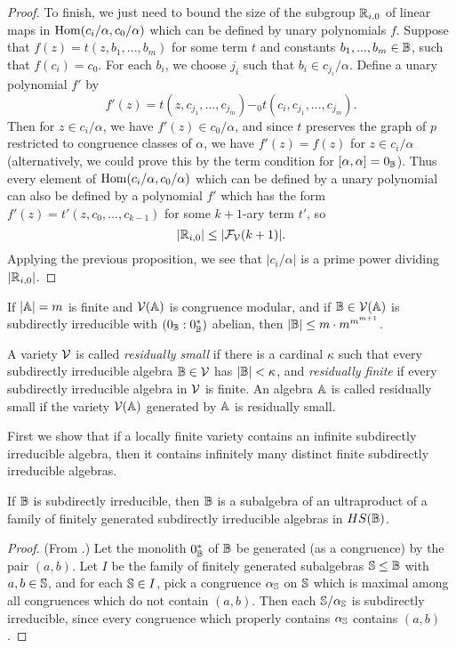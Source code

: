 \begin{appendices}
\begin{proof}
To finish, we just need to bound the size of the subgroup $\mathbb{R}_{i,0}$ of linear maps in $\operatorname{Hom}(c_i/\alpha, c_0/\alpha)$ which can be defined by unary polynomials $f$. Suppose that $f(z) = t(z,b_1, ..., b_m)$ for some term $t$ and constants $b_1, ..., b_m \in \mathbb{B}$, such that $f(c_i) = c_0$. For each $b_i$, we choose $j_i$ such that $b_i \in c_{j_i}/\alpha$. Define a unary polynomial $f'$ by
\[
f'(z) = t(z,c_{j_1}, ..., c_{j_m}) -_0 t(c_i, c_{j_1}, ..., c_{j_m}).
\]
Then for $z \in c_i/\alpha$, we have $f'(z) \in c_0/\alpha$, and since $t$ preserves the graph of $p$ restricted to congruence classes of $\alpha$, we have $f'(z) = f(z)$ for $z \in c_i/\alpha$ (alternatively, we could prove this by the term condition for $[\alpha,\alpha] = 0_{\mathbb{B}}$). Thus every element of $\operatorname{Hom}(c_i/\alpha,c_0/\alpha)$ which can be defined by a unary polynomial can also be defined by a polynomial $f'$ which has the form $f'(z) = t'(z,c_0,...,c_{k-1})$ for some $k+1$-ary term $t'$, so
\[
|\mathbb{R}_{i,0}| \le |\mathcal{F}_{\mathcal{V}}(k+1)|.
\]
Applying the previous proposition, we see that $|c_i/\alpha|$ is a prime power dividing $|\mathbb{R}_{i,0}|$.
\end{proof}

\begin{cor}\label{subdirect-bound-ab} If $|\mathbb{A}| = m$ is finite and $\mathcal{V}(\mathbb{A})$ is congruence modular, and if $\mathbb{B} \in \mathcal{V}(\mathbb{A})$ is subdirectly irreducible with $(0_{\mathbb{B}}:0_{\mathbb{B}}^*)$ abelian, then $|\mathbb{B}| \le m\cdot m^{m^{m+1}}$.
\end{cor}

\begin{defn} A variety $\mathcal{V}$ is called \emph{residually small} if there is a cardinal $\kappa$ such that every subdirectly irreducible algebra $\mathbb{B} \in \mathcal{V}$ has $|\mathbb{B}| < \kappa$, and \emph{residually finite} if every subdirectly irreducible algebra in $\mathcal{V}$ is finite. An algebra $\mathbb{A}$ is called residually small if the variety $\mathcal{V}(\mathbb{A})$ generated by $\mathbb{A}$ is residually small.
\end{defn}

First we show that if a locally finite variety contains an infinite subdirectly irreducible algebra, then it contains infinitely many distinct finite subdirectly irreducible algebras.

\begin{thm}\label{ultraproduct-fin-gen} If $\mathbb{B}$ is subdirectly irreducible, then $\mathbb{B}$ is a subalgebra of an ultraproduct of a family of finitely generated subdirectly irreducible algebras in $HS(\mathbb{B})$.
\end{thm}
\begin{proof} (From \cite{commutator-theory}.) Let the monolith $0_{\mathbb{B}}^*$ of $\mathbb{B}$ be generated (as a congruence) by the pair $(a,b)$. Let $I$ be the family of finitely generated subalgebras $\mathbb{S} \le \mathbb{B}$ with $a,b \in \mathbb{S}$, and for each $\mathbb{S} \in I$, pick a congruence $\alpha_{\mathbb{S}}$ on $\mathbb{S}$ which is maximal among all congruences which do not contain $(a,b)$. Then each $\mathbb{S}/\alpha_{\mathbb{S}}$ is subdirectly irreducible, since every congruence which properly contains $\alpha_{\mathbb{S}}$ contains $(a,b)$.


\end{proof}
\end{appendices}
